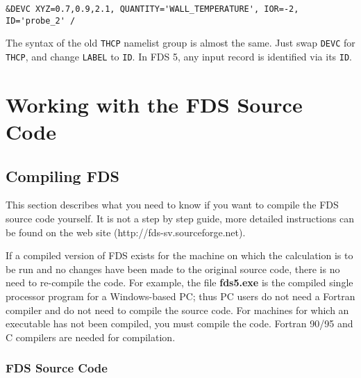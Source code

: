 \documentclass[11pt]{book}
\newcommand{\ct}{\tt\small}
\begin{document}
\footnotesize
\begin{verbatim}
&DEVC XYZ=0.7,0.9,2.1, QUANTITY='WALL_TEMPERATURE', IOR=-2, ID='probe_2' /
\end{verbatim}
\normalsize

\noindent
The syntax of the old {\ct THCP} namelist group is almost the same. Just swap {\ct DEVC} for {\ct THCP}, and change {\ct LABEL} to
{\ct ID}. In FDS 5, any input record is identified via its {\ct ID}.






\part{Working with the FDS Source Code}


\chapter{Compiling FDS}
\label{info:compilation}

This section describes what you need to know if you want to compile the FDS source code yourself.
It is not a step by step guide, more detailed instructions can be found on the web site (http://fds-sv.sourceforge.net).

If a compiled version of FDS exists for the machine on which the
calculation is to be run and no changes have been made to
the original source code, there is no need to re-compile the code.
For example, the file {\bf fds5.exe} is the
compiled single processor program for a Windows-based PC;
thus PC users do not need a
Fortran compiler and do not need to compile the source code.
For machines for which an executable has not been compiled, you must
compile the code. Fortran 90/95 and C compilers are needed for compilation.

\section{FDS Source Code}
\end{document}
